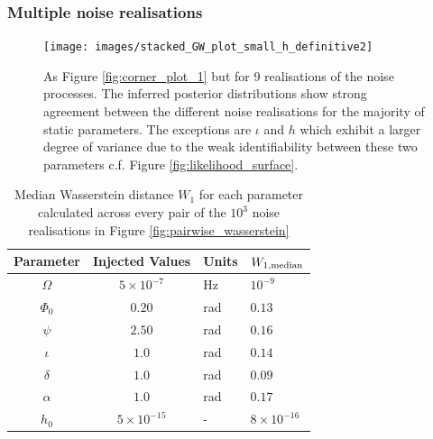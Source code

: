 \documentclass[fleqn,usenatbib,useAMS]{mnras}
\begin{document}
\subsubsection{Multiple noise realisations} \label{sec:multiple_noise}
\begin{figure}
	\texttt{[image: images/stacked\_GW\_plot\_small\_h\_definitive2]}
	\caption{As Figure \ref{fig:corner_plot_1} but for 9 realisations of the noise processes. The inferred posterior distributions show strong agreement between the different noise realisations for the majority of static parameters. The exceptions are $\iota$ and $h$ which exhibit a larger degree of variance due to the weak identifiability between these two parameters c.f. Figure \ref{fig:likelihood_surface}.} 
	\label{fig:corner_plot_2}
\end{figure}
\begin{table}
	\centering
	\begin{tabular}{ccll}
		\toprule
		Parameter & Injected Values & Units & $W_{1, \rm median}$  \\
		\hline
		$\Omega$     &   $5 \times 10^{-7}$ & Hz & $10^{-9}$ \\
		$\Phi_0$          & $0.20$ & rad & $0.13$ \\
		$\psi$              & $2.50$ & rad & $0.16$ \\
		$\iota$             & $1.0$ & rad & $0.14$ \\ 
		$\delta$              & $1.0$  & rad & $0.09$ \\
		$\alpha$          & $1.0$  & rad & $0.17$\\
		$h_0$            & $5 \times 10^{-15}$ & - & $8 \times 10^{-16}$ \\
		\bottomrule
	\end{tabular}
	\caption{Median Wasserstein distance $W_1$ for each parameter calculated across every pair of the $10^3$ noise realisations in Figure \ref{fig:pairwise_wasserstein}}
	\label{tab:Wasserstein}
\end{table}
\end{document}
